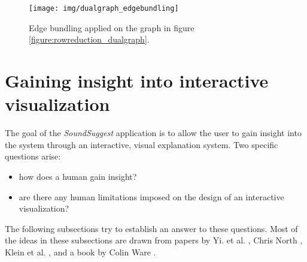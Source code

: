 \begin{figure}%
	\begin{center}
		\texttt{[image: img/dualgraph\_edgebundling]}%
	\end{center}
	\caption{Edge bundling applied on the graph in figure \ref{figure:rowreduction_dualgraph}.}%
	\label{figure:edgebundling_dualgraph}%
\end{figure}











% 
\section{Gaining insight into interactive visualization}\label{chapter:literature_study:section:user}

The goal of the \emph{SoundSuggest} application is to allow the user to gain insight into the system through an interactive, visual explanation system. Two specific questions arise:

\begin{itemize}
	\item how does a human gain insight?
	\item are there any human limitations imposed on the design of an interactive visualization?
\end{itemize}

The following subsections try to establish an answer to these questions. Most of the ideas in these subsections are drawn from papers by Yi. et al. \cite{yi:2008}, Chris North \cite{north:2006}, Klein et al. \cite{Klein:2006:MSS:1158821.1159015, klein:2006:MSS:1175882.1176017}, and a book by Colin Ware \cite{ware:2004}.










